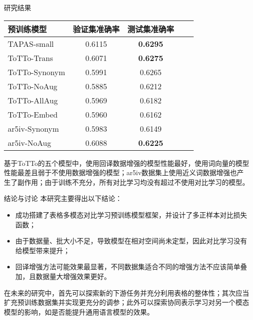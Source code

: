 \documentclass[final,hyperref={pdfpagelabels=false}]{ctexbeamer}
\begin{document}
\begin{frame}[t]
\begin{columns}[t]
\begin{column}{.3\textwidth}
\begin{block}{研究结果}
      \vspace{4mm}
      \begin{table}[h]
          \small
          \centering
          \begin{tabular}{lcccl}
              \toprule[1.5pt]
              预训练模型 & 验证集准确率 & 测试集准确率\\
              \midrule[1pt]
              TAPAS-small & 0.6115 & \textbf{0.6295}\\
              \midrule[1pt]
              ToTTo-Trans & 0.6071 & \textbf{0.6275}\\
              ToTTo-Synonym & 0.5991 & 0.6265\\
              ToTTo-NoAug & 0.5885 & 0.6212\\
              ToTTo-AllAug & 0.5969 & 0.6182\\
              ToTTo-Embed & 0.5960 & 0.6162\\
              \midrule[1pt]
              ar5iv-Synonym & 0.5983 & 0.6149\\
              ar5iv-NoAug & 0.6088 & \textbf{0.6225}\\
              \bottomrule[1.5pt]
          \end{tabular}
      \end{table}
    
      \vspace{4mm}
      基于ToTTo的五个模型中，使用回译数据增强的模型性能最好，使用词向量的模型性能最差且弱于不使用数据增强的模型；ar5iv数据集上使用近义词数据增强也产生了副作用；由于训练不充分，所有对比学习均没有超过不使用对比学习的模型。
    \end{block}


    \begin{block}{结论与讨论}
    本研究主要得出以下结论：
    \vspace{4mm}
    \begin{itemize}
      \item 成功搭建了表格多模态对比学习预训练模型框架，并设计了多正样本对比损失函数；
      \item 由于数据量、批大小不足，导致模型在相对空间尚未定型，因此对比学习没有给模型带来提升；
      \item 回译增强方法可能效果最显著，不同数据集适合不同的增强方法不应该简单叠加，且数据量大增强效果更好。
    \end{itemize}

    \vspace{4mm}
    在未来的研究中，首先可以探索新的下游任务并充分利用表格的整体性；其次应当扩充预训练数据集并实现更充分的调参；此外可以探索协同表示学习对另一个模态模型的影响，如是否能提升通用语言模型的效果。
    \vspace{4mm}
  \end{block}


\end{column}
\end{columns}
\end{frame}
\end{document}
